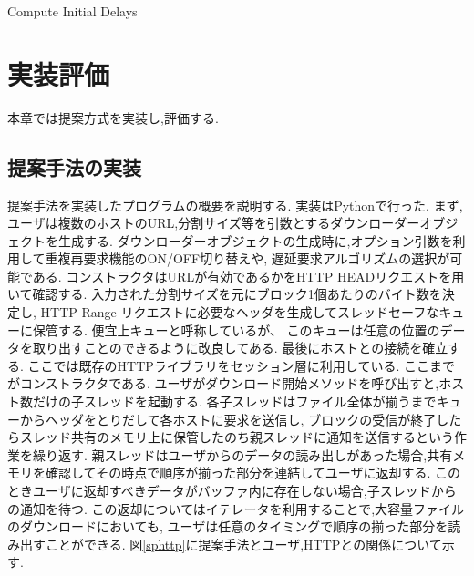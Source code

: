 \documentclass[a4j,12pt]{gradthesis_utf8}
\begin{document}
\begin{algorithm}
	\caption{Compute Initial Delays}
	\begin{algorithmic}[1]
		\EndFor
	\end{algorithmic}
	
\end{algorithm}


\chapter{実装評価}\label{sec:sec4}

本章では提案方式を実装し,評価する.

\section{提案手法の実装}
提案手法を実装したプログラムの概要を説明する.
実装はPythonで行った.
まず,ユーザは複数のホストのURL,分割サイズ等を引数とするダウンローダーオブジェクトを生成する.
ダウンローダーオブジェクトの生成時に,オプション引数を利用して重複再要求機能のON/OFF切り替えや,
遅延要求アルゴリズムの選択が可能である.
コンストラクタはURLが有効であるかをHTTP HEADリクエストを用いて確認する.
入力された分割サイズを元にブロック1個あたりのバイト数を決定し,
HTTP-Range リクエストに必要なヘッダを生成してスレッドセーフなキューに保管する.
便宜上キューと呼称しているが、
このキューは任意の位置のデータを取り出すことのできるように改良してある.
最後にホストとの接続を確立する.
ここでは既存のHTTPライブラリをセッション層に利用している.
ここまでがコンストラクタである.
ユーザがダウンロード開始メソッドを呼び出すと,ホスト数だけの子スレッドを起動する.
各子スレッドはファイル全体が揃うまでキューからヘッダをとりだして各ホストに要求を送信し,
ブロックの受信が終了したらスレッド共有のメモリ上に保管したのち親スレッドに通知を送信するという作業を繰り返す.
親スレッドはユーザからのデータの読み出しがあった場合,共有メモリを確認してその時点で順序が揃った部分を連結してユーザに返却する.
このときユーザに返却すべきデータがバッファ内に存在しない場合,子スレッドからの通知を待つ.
この返却についてはイテレータを利用することで,大容量ファイルのダウンロードにおいても,
ユーザは任意のタイミングで順序の揃った部分を読み出すことができる.
図\ref{sphttp}に提案手法とユーザ,HTTPとの関係について示す.

\end{document}

